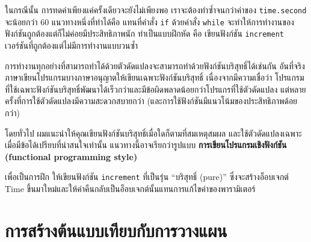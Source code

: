 ในกรณีนั้น การทดค่าเพียงแค่ครั้งเดียวจะยังไม่เพียงพอ เราจะต้องทำซ้ำจนกว่าค่าของ {\tt time.second} จะน้อยกว่า 60 
แนวทางหนึ่งที่ทำได้คือ แทนที่คำสั่ง  {\tt if} ด้วยคำสั่ง {\tt while} จะทำให้การทำงานของฟังก์ชันถูกต้องแต่ก็ไม่ค่อยมีประสิทธิภาพนัก 
ทำเป็นแบบฝึกหัด คือ เขียนฟังก์ชัน {\tt increment} เวอร์ชันที่ถูกต้องแต่ไม่มีการทำงานแบบวนซ้ำ



การทำงานทุกอย่างที่สามารถทำได้ด้วยตัวดัดแปลงจะสามารถทำด้วยฟังก์ชันบริสุทธิ์ได้เช่นกัน 
อันที่จริงภาษาเขียนโปรแกรมบางภาษาอนุญาตให้เขียนเฉพาะฟังก์ชันบริสุทธิ์ เนื่องจากมีความเชื่อว่า 
โปรแกรมที่ใช้เฉพาะฟังก์ชันบริสุทธิ์พัฒนาได้เร็วกว่าและมีข้อผิดพลาดน้อยกว่าโปรแกรที่ใช้ตัวดัดแปลง 
แต่หลายครั้งที่การใช้ตัวดัดแปลงมีความสะดวกสบายกว่า (และการใช้ฟังก์ชันมีแนวโน้มของประสิทธิภาพด้อยกว่า)



โดยทั่วไป ผมแนะนำให้คุณเขียนฟังก์ชันบริสุทธิ์เมื่อใดก็ตามที่สมเหตุสมผล และใช้ตัวดัดแปลงเฉพาะเมื่อมีข้อได้เปรียบที่น่าสนใจเท่านั้น 
แนวทางนี้อาจเรียกว่ารูปแบบ {\bf การเขียนโปรแกรมเชิงฟังก์ชัน (functional programming style)}


เพื่อเป็นการฝึก ให้เขียนฟังก์ชัน {\tt increment} ที่เป็นรุ่น ``บริสุทธิ์ (pure)'' 
ซึ่งจะสร้างอ็อบเจกต์ Time ขึ้นมาใหม่และให้ค่าคืนกลับเป็นอ็อบเจกต์นั้นแทนการแก้ไขค่าของพารามิเตอร์

\section{การสร้างต้นแบบเทียบกับการวางแผน} %
\label{prototype}

